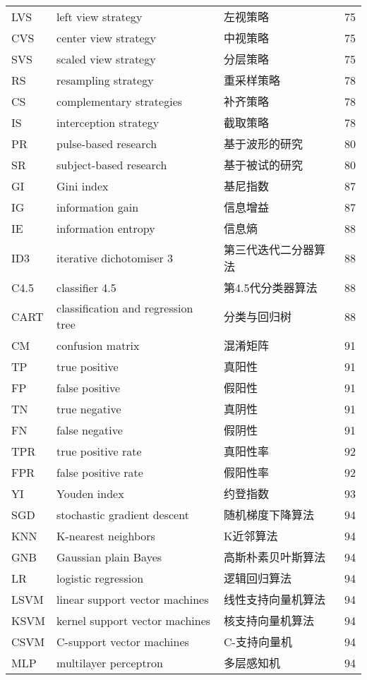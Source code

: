\begin{center}
\begin{longtable}{m{2cm}m{7cm}m{5cm}m{1cm}<{\centering}}
        LVS & left view strategy & 左视策略 & 75 \\
        CVS & center view strategy & 中视策略 & 75 \\
        SVS & scaled view strategy & 分层策略 & 75 \\
        RS & resampling strategy & 重采样策略 & 78 \\
        CS & complementary strategies & 补齐策略 & 78 \\
        IS & interception strategy & 截取策略 & 78 \\
        PR & pulse-based research & 基于波形的研究 & 80 \\
        SR & subject-based research &基于被试的研究 & 80 \\

        GI & Gini index & 基尼指数 & 87 \\
        IG & information gain & 信息增益 & 87 \\
        IE & information entropy & 信息熵 & 88 \\
        ID3 & iterative dichotomiser 3 & 第三代迭代二分器算法 & 88 \\
        C4.5 & classifier 4.5 & 第4.5代分类器算法 & 88 \\ 
        CART & classification and regression tree & 分类与回归树 & 88 \\
        CM & confusion matrix & 混淆矩阵 & 91 \\
        TP &  true positive & 真阳性 & 91 \\
        FP & false positive & 假阳性 & 91 \\
        TN & true negative & 真阴性 & 91 \\
        FN & false negative & 假阴性 & 91 \\
        TPR &  true positive rate & 真阳性率 & 92 \\
        FPR & false positive rate& 假阳性率 & 92 \\
        YI  & Youden index & 约登指数& 93 \\
        SGD & stochastic gradient descent & 随机梯度下降算法 & 94 \\
        KNN & K-nearest neighbors & K近邻算法 & 94 \\
        GNB & Gaussian plain Bayes & 高斯朴素贝叶斯算法 & 94 \\
        LR  & logistic regression  & 逻辑回归算法 & 94 \\
        LSVM & linear support vector machines & 线性支持向量机算法 & 94 \\
        KSVM & kernel support vector machines & 核支持向量机算法 & 94 \\
        CSVM & C-support vector machines & C-支持向量机 & 94 \\
        MLP & multilayer perceptron & 多层感知机 & 94 \\
	\end{longtable}
\end{center}